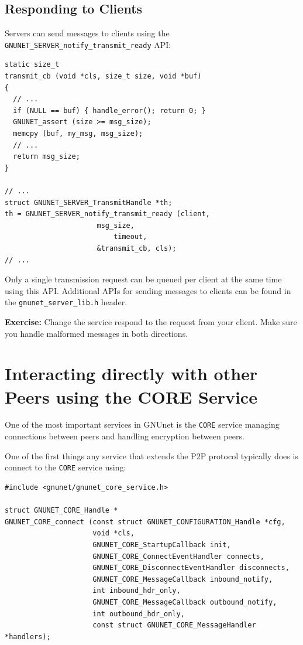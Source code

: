 \documentclass[10pt]{article}
\newcommand{\exercise}[1]{\noindent\begin{boxedminipage}{\textwidth}{\bf Exercise:} #1 \end{boxedminipage}}
\begin{document}
\subsection{Responding to Clients}

Servers can send messages to clients using the
{\tt GNUNET\_SERVER\_notify\_transmit\_ready} API:

\lstset{language=c}
\begin{lstlisting}
static size_t
transmit_cb (void *cls, size_t size, void *buf)
{
  // ...
  if (NULL == buf) { handle_error(); return 0; }
  GNUNET_assert (size >= msg_size);
  memcpy (buf, my_msg, msg_size);
  // ...
  return msg_size;
}

// ...	
struct GNUNET_SERVER_TransmitHandle *th;
th = GNUNET_SERVER_notify_transmit_ready (client,
					  msg_size,
 				          timeout,
					  &transmit_cb, cls);
// ...
\end{lstlisting}

Only a single transmission request can be queued per client
at the same time using this API.
Additional APIs for sending messages to clients can be found
in the {\tt gnunet\_server\_lib.h} header.  


\exercise{Change the service respond to the request from your
client.  Make sure you handle malformed messages in both directions.}


\section{Interacting directly with other Peers using the CORE Service}

One of the most important services in GNUnet is the \texttt{CORE} service 
managing connections between peers and handling encryption between peers.

One of the first things any service that extends the P2P protocol typically does
is connect to the \texttt{CORE} service using:

\lstset{language=C}
\begin{lstlisting}
#include <gnunet/gnunet_core_service.h>

struct GNUNET_CORE_Handle *
GNUNET_CORE_connect (const struct GNUNET_CONFIGURATION_Handle *cfg,
                     void *cls,
                     GNUNET_CORE_StartupCallback init,
                     GNUNET_CORE_ConnectEventHandler connects,
                     GNUNET_CORE_DisconnectEventHandler disconnects,
                     GNUNET_CORE_MessageCallback inbound_notify,
                     int inbound_hdr_only,
                     GNUNET_CORE_MessageCallback outbound_notify,
                     int outbound_hdr_only,
                     const struct GNUNET_CORE_MessageHandler *handlers);
\end{lstlisting}
\end{document}

